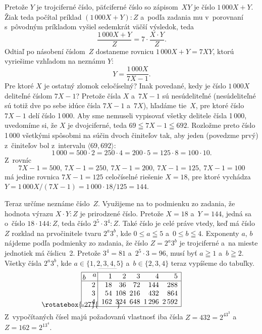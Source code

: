 {%

Pretože $Y$ je trojciferné číslo, päťciferné číslo so zápisom~$XY$
je číslo $1\,000X+Y$. Žiak teda počítal príklad $(1\,000X+Y):Z$ 
a~podľa zadania mu v~porovnaní s~pôvodným príkladom vyšiel
sedemkrát väčší výsledok, teda
$$
\frac{1\,000X+Y}{Z}=7\cdot\frac{X\cdot Y}{Z}.
$$
Odtiaľ po násobení číslom~$Z$ dostaneme rovnicu $1\,000X+Y=7XY$,
ktorú vyriešime vzhľadom na neznámu $Y$:
$$
Y=\frac{1\,000X}{7X-1}.
$$
Pre ktoré $X$ je ostatný zlomok celočíselný? Inak povedané,
kedy je číslo $1\,000X$ deliteľné číslom $7X-1$? Pretože čísla $X$ 
a~$7X-1$ sú nesúdeliteľné (nesúdeliteľné sú totiž dve po sebe idúce
čísla $7X-1$ a~$7X$), hľadáme tie~$X$, pre ktoré číslo $7X-1$
delí číslo 1\,000. Aby sme nemuseli vypisovať všetky
delitele čísla 1\,000, uvedomíme si, že $X$ je dvojciferné, teda
$69\leqq7X-1\leqq692$. Rozložme preto číslo 1\,000 všetkými spôsobmi na súčin
dvoch činiteľov tak, aby jeden (povedzme prvý) z~činiteľov
bol z~intervalu $\langle69,692\rangle$:
$$
1\,000=500\cdot2=250\cdot4=200\cdot5=125\cdot8=100\cdot10.
$$
Z~rovníc
$$
7X-1=500,\ 7X-1=250,\ 7X-1=200,\ 7X-1=125,\ 7X-1=100
$$
má jedine rovnica $7X-1=125$ celočíselné riešenie
$X=18$, pre ktoré vychádza $Y=1\,000X/(7X-1)=1\,000\cdot18/125=144$.

Teraz určíme neznáme číslo~$Z$. Využijeme na to podmienku zo zadania,
že hodnota výrazu $X\cdot Y:Z$ je prirodzené číslo. Pretože $X=18$
a~$Y=144$, jedná sa o~číslo $18\cdot144:Z$, teda číslo
$2^5\cdot3^4:Z$. Také číslo je celé práve vtedy, keď má číslo~$Z$
rozklad na prvočinitele tvaru $2^a3^b$, kde $0\le a\leqq5$
a~$0\le b\leqq4$. Exponenty $a$, $b$ nájdeme podľa podmienky zo zadania,
že číslo $Z=2^a3^b$ je trojciferné a~na mieste jednotiek má
číslicu~2. Pretože $3^4=81$ a~$2^5\cdot3=96$, musí byť $a\geqq1$
a~$b\geqq2$. Všetky čísla $2^a3^b$, kde $a\in\{1,2,3,4,5\}$
a~$b\in\{2,3,4\}$ teraz vypíšeme do tabuľky.
\def\clap#1{\hbox to 0pt{\hss#1\hss}}
\def\sikma{\smash{\clap{\kern-0.3mm\rotatebox{-27}{\rule[19.13mm]{.92cm}{.4pt}}}}}
$$
\sikma
\vbox{\offinterlineskip \let\\=\cr
\def\ab{\raise\ht\strutbox\hbox{}%
        \,\lower2pt\hbox{$b$}\quad
        \raise.5ex\hbox{$a$}\,\lower\dp\strutbox\hbox{}}%
\halign{\vrule\strut\hss#\vrule
        &\enspace\hss$#$\enspace&\hss$#$\enspace&\hss$#$\enspace&\hss$#$\enspace&\hss$#$\enspace\vrule\\
\noalign{\hrule}
\ab   &1   &2    &3    &4     &5\\
\noalign{\hrule}
2  &18  &36   &72   &144    &288\\
3  &54  &108  &216  &432    &864\\
4  &162 &324  &648  &1\,296 &2\,592\cr
\noalign{\hrule}
}}%
$$
Z~vypočítaných čísel majú požadovanú vlastnosť iba čísla
$Z=432=2^43^3$ a~$Z=162=2^13^4$.

}
